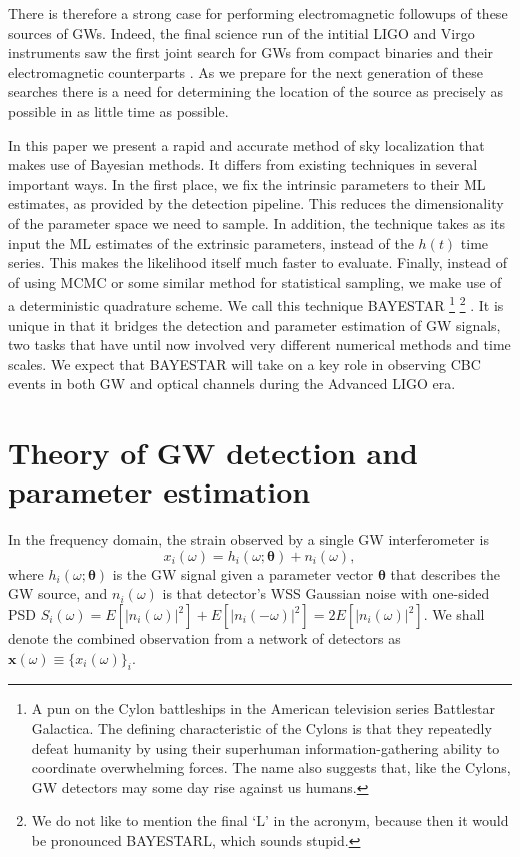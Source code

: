 \documentclass[amsmath,amssymb,aps,prx,reprint,nopreprintnumbers,nofootinbib]{revtex4-1}
\begin{document}
There is therefore a strong case for performing electromagnetic followups of these sources of \acp{GW}. Indeed, the final science run of the intitial LIGO and Virgo instruments saw the first joint search for \acp{GW} from compact binaries and their electromagnetic counterparts \cite{abadie2012first}.  As we prepare for the next generation of these searches there is a need for determining the location of the source as precisely as possible in as little time as possible.

In this paper we present a rapid and accurate method of sky localization that makes use of Bayesian methods. It differs from existing techniques in several important ways.  In the first place, we fix the intrinsic parameters to their \ac{ML} estimates, as provided by the detection pipeline.  This reduces the dimensionality of the parameter space we need to sample. In addition, the technique takes as its input the \ac{ML} estimates of the extrinsic parameters, instead of the $h(t)$ time series. This makes the likelihood itself much faster to evaluate. Finally, instead of of using \ac{MCMC} or some similar method for statistical sampling, we make use of a deterministic quadrature scheme. We call this technique \ac{BAYESTAR}%
%
\footnote{A pun on the Cylon battleships in the American television series Battlestar Galactica. The defining characteristic of the Cylons is that they repeatedly defeat humanity by using their superhuman information\nobreakdashes-gathering ability to coordinate overwhelming forces. The name also suggests that, like the Cylons, \ac{GW} detectors may some day rise against us humans.}%
%
\footnote{We do not like to mention the final `L' in the acronym, because then it would be pronounced BAYESTARL, which sounds stupid.}%
. It is unique in that it bridges the detection and parameter estimation of \ac{GW} signals, two tasks that have until now involved very different numerical methods and time scales. We expect that \ac{BAYESTAR} will take on a key role in observing \ac{CBC} events in both \ac{GW} and optical channels during the Advanced \ac{LIGO} era.

\section{Theory of \ac{GW} detection and parameter estimation}

In the frequency domain, the strain observed by a single \ac{GW} interferometer is
%
\begin{equation}\label{eq:signal-model}
    x_i (\omega) = h_i (\omega; \bm\theta) + n_i (\omega),
\end{equation}
%
where $h_i (\omega; \bm\theta)$ is the \ac{GW} signal given a parameter vector $\bm\theta$ that describes the \ac{GW} source, and $n_i (\omega)$ is that detector's \ac{WSS} Gaussian noise with one\nobreakdashes-sided \ac{PSD} $S_i(\omega) = E\left[\left|n_i(\omega)\right|^2\right] + E\left[\left|n_i(-\omega)\right|^2\right] = 2 E\left[\left|n_i(\omega)\right|^2\right]$. We shall denote the combined observation from a network of detectors as $\mathbf x (\omega) \equiv \{x_i (\omega)\}_i$.
\end{document}
